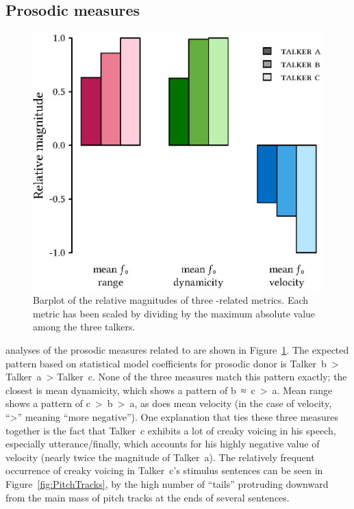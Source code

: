 
\subsection{Prosodic measures}
\begin{figure}[bt]
	\begin{centering}
	\includegraphics{figures/posthocs/ProsodicMeasuresPitchOnly.eps}
	\caption[Barplot of \fo{} metrics]{Barplot of the relative magnitudes of three \fo-related metrics.  Each metric has been scaled by dividing by the maximum absolute value among the three talkers.\label{fig:ProsodicMeasuresPitch}}
	\end{centering}
\end{figure}

\Ph{} analyses of the prosodic measures related to \fo{} are shown in Figure~\ref{fig:ProsodicMeasuresPitch}.  The expected pattern based on statistical model coefficients for prosodic donor is Talker~\ac{b}~> Talker~\ac{a}~> Talker~\ac{c}.  None of the three measures match this pattern exactly; the closest is mean \fo{} dynamicity, which shows a pattern of \ac{b}~≈~\ac{c}~>~\ac{a}.  Mean \fo{} range shows a pattern of \ac{c}~>~\ac{b}~>~\ac{a}, as does mean \fo{} velocity (in the case of velocity, “>” meaning “more negative”).\footnotemark{}  One explanation that ties these three measures together is the fact that Talker~\ac{c} exhibits a lot of creaky voicing in his speech, especially utterance\-/finally, which accounts for his highly negative value of \fo{} velocity (nearly twice the magnitude of Talker~\ac{a}).  The relatively frequent occurrence of creaky voicing in Talker~\ac{c}’s stimulus sentences can be seen in Figure~\ref{fig:PitchTracks}, by the high number of “tails” protruding downward from the main mass of pitch tracks at the ends of several sentences.

